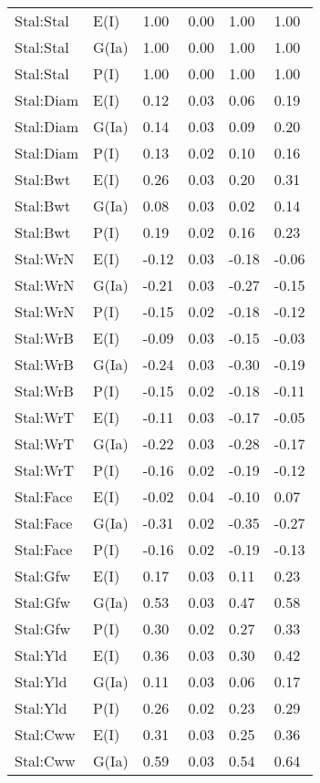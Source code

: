 \begin{center}
\begin{longtable}{|p{1.1in}|p{0.7in}|p{0.7in}|p{0.6in}|p{0.6in}|p{0.6in}|}
  Stal:Stal & E(I) & 1.00 & 0.00 & 1.00 & 1.00 \\ 
  Stal:Stal & G(Ia) & 1.00 & 0.00 & 1.00 & 1.00 \\ 
  Stal:Stal & P(I) & 1.00 & 0.00 & 1.00 & 1.00 \\ 
  Stal:Diam & E(I) & 0.12 & 0.03 & 0.06 & 0.19 \\ 
  Stal:Diam & G(Ia) & 0.14 & 0.03 & 0.09 & 0.20 \\ 
  Stal:Diam & P(I) & 0.13 & 0.02 & 0.10 & 0.16 \\ 
  Stal:Bwt & E(I) & 0.26 & 0.03 & 0.20 & 0.31 \\ 
  Stal:Bwt & G(Ia) & 0.08 & 0.03 & 0.02 & 0.14 \\ 
  Stal:Bwt & P(I) & 0.19 & 0.02 & 0.16 & 0.23 \\ 
  Stal:WrN & E(I) & -0.12 & 0.03 & -0.18 & -0.06 \\ 
  Stal:WrN & G(Ia) & -0.21 & 0.03 & -0.27 & -0.15 \\ 
  Stal:WrN & P(I) & -0.15 & 0.02 & -0.18 & -0.12 \\ 
  Stal:WrB & E(I) & -0.09 & 0.03 & -0.15 & -0.03 \\ 
  Stal:WrB & G(Ia) & -0.24 & 0.03 & -0.30 & -0.19 \\ 
  Stal:WrB & P(I) & -0.15 & 0.02 & -0.18 & -0.11 \\ 
  Stal:WrT & E(I) & -0.11 & 0.03 & -0.17 & -0.05 \\ 
  Stal:WrT & G(Ia) & -0.22 & 0.03 & -0.28 & -0.17 \\ 
  Stal:WrT & P(I) & -0.16 & 0.02 & -0.19 & -0.12 \\ 
  Stal:Face & E(I) & -0.02 & 0.04 & -0.10 & 0.07 \\ 
  Stal:Face & G(Ia) & -0.31 & 0.02 & -0.35 & -0.27 \\ 
  Stal:Face & P(I) & -0.16 & 0.02 & -0.19 & -0.13 \\ 
  Stal:Gfw & E(I) & 0.17 & 0.03 & 0.11 & 0.23 \\ 
  Stal:Gfw & G(Ia) & 0.53 & 0.03 & 0.47 & 0.58 \\ 
  Stal:Gfw & P(I) & 0.30 & 0.02 & 0.27 & 0.33 \\ 
  Stal:Yld & E(I) & 0.36 & 0.03 & 0.30 & 0.42 \\ 
  Stal:Yld & G(Ia) & 0.11 & 0.03 & 0.06 & 0.17 \\ 
  Stal:Yld & P(I) & 0.26 & 0.02 & 0.23 & 0.29 \\ 
  Stal:Cww & E(I) & 0.31 & 0.03 & 0.25 & 0.36 \\ 
  Stal:Cww & G(Ia) & 0.59 & 0.03 & 0.54 & 0.64 \\ 

\end{longtable}
\end{center}
